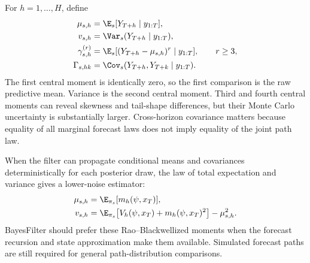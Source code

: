 For $h=1,\ldots,H$, define
\begin{align}
  \mu_{s,h}
    &= \E_s[Y_{T+h}\mid y_{1:T}],                                         \\
  v_{s,h}
    &= \Var_s(Y_{T+h}\mid y_{1:T}),                                      \\
  \gamma_{s,h}^{(r)}
    &= \E_s[(Y_{T+h}-\mu_{s,h})^r\mid y_{1:T}],\qquad r\geq 3,            \\
  \Gamma_{s,hk}
    &= \Cov_s(Y_{T+h},Y_{T+k}\mid y_{1:T}).
  \label{eq:bf-ssl-lstm-predictive-moments}
\end{align}
The first central moment is identically zero, so the first comparison is the
raw predictive mean.  Variance is the second central moment.  Third and fourth
central moments can reveal skewness and tail-shape differences, but their Monte
Carlo uncertainty is substantially larger.  Cross-horizon covariance matters
because equality of all marginal forecast laws does not imply equality of the
joint path law.

When the filter can propagate conditional means and covariances
deterministically for each posterior draw, the law of total expectation and
variance gives a lower-noise estimator:
\begin{align}
  \mu_{s,h}
    &= \E_{\pi_s}[m_h(\psi,x_T)],                                         \\
  v_{s,h}
    &= \E_{\pi_s}\!\left[V_h(\psi,x_T)+m_h(\psi,x_T)^2\right]
       -\mu_{s,h}^2.
  \label{eq:bf-ssl-lstm-rao-blackwell-moments}
\end{align}
BayesFilter should prefer these Rao--Blackwellized moments when the forecast
recursion and state approximation make them available.  Simulated forecast
paths are still required for general path-distribution comparisons.


